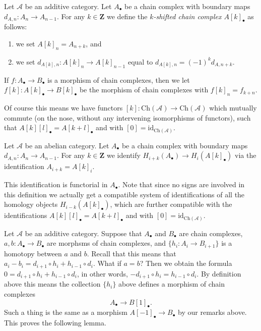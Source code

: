 \begin{definition}
\label{definition-shift}
Let $\mathcal{A}$ be an additive category.
Let $A_\bullet$ be a chain complex
with boundary maps $d_{A, n} : A_n \to A_{n - 1}$.
For any $k \in \mathbf{Z}$ we define the
{\it $k$-shifted chain complex $A[k]_\bullet$}
as follows:
\begin{enumerate}
\item we set $A[k]_n = A_{n + k}$, and
\item we set $d_{A[k], n} : A[k]_n \to A[k]_{n - 1}$
equal to $d_{A[k], n} = (-1)^k d_{A, n + k}$.
\end{enumerate}
If $f : A_\bullet \to B_\bullet$ is a morphism of
chain complexes, then we let
$f[k] : A[k]_\bullet \to B[k]_\bullet$ be the
morphism of chain complexes with
$f[k]_n = f_{k + n}$.
\end{definition}

\noindent
Of course this means we have functors
$[k] : \text{Ch}(\mathcal{A}) \to \text{Ch}(\mathcal{A})$
which mutually commute (on the nose, without
any intervening isomorphisms of functors),
such that $A[k][l]_\bullet = A[k + l]_\bullet$ and
with $[0] = \text{id}_{\text{Ch}(\mathcal{A})}$.

\begin{definition}
\label{definition-homology-shift}
Let $\mathcal{A}$ be an abelian category.
Let $A_\bullet$ be a chain complex
with boundary maps $d_{A, n} : A_n \to A_{n - 1}$.
For any $k \in \mathbf{Z}$ we identify
{\it $H_{i + k}(A_\bullet) \rightarrow H_i(A[k]_\bullet)$}
via the identification
$A_{i + k} = A[k]_i$.
\end{definition}

\noindent
This identification is functorial in $A_\bullet$.
Note that since no signs are involved in this
definition we actually get a compatible system
of identifications of all the homology
objects $H_{i - k}(A[k]_\bullet)$, which are
further compatible with the identifications
$A[k][l]_\bullet = A[k + l]_\bullet$ and
with $[0] = \text{id}_{\text{Ch}(\mathcal{A})}$.

\medskip\noindent
Let $\mathcal{A}$ be an additive category.
Suppose that $A_\bullet$ and $B_\bullet$ are
chain complexes, $a, b : A_\bullet \to B_\bullet$ are
morphsms of chain complexes, and $\{h_i : A_i \to B_{i + 1}\}$
is a homotopy between $a$ and $b$. Recall that this means
that
$a_i - b_i = d_{i + 1} \circ h_i + h_{i - 1} \circ d_i$.
What if $a = b$? Then we obtain the formula
$0 = d_{i + 1} \circ h_i + h_{i - 1} \circ d_i$,
in other words, $ - d_{i + 1} \circ h_i = h_{i - 1} \circ d_i$.
By definition above this means the collection $\{h_i\}$
above defines a morphism of chain complexes
$$
A_\bullet \longrightarrow B[1]_\bullet.
$$
Such a thing is the same as a morphism $A[-1]_\bullet \to B_\bullet$
by our remarks above. This proves the following lemma.

